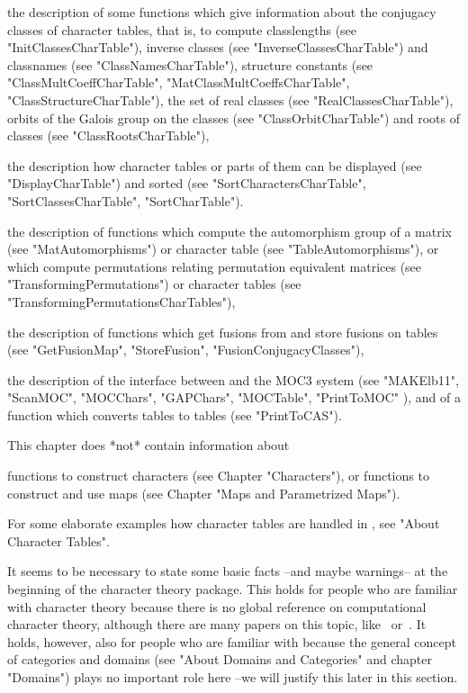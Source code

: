 the  description  of  some functions  which  give information  about  the
conjugacy  classes of character tables, that  is, to compute classlengths
(see       "InitClassesCharTable"),      inverse       classes       (see
"InverseClassesCharTable")  and  classnames  (see "ClassNamesCharTable"),
structure        constants        (see         "ClassMultCoeffCharTable",
"MatClassMultCoeffsCharTable",  "ClassStructureCharTable"),  the  set  of
real  classes (see "RealClassesCharTable"), orbits of the Galois group on
the  classes  (see  "ClassOrbitCharTable")  and  roots  of  classes  (see
"ClassRootsCharTable"),

the  description  how character tables or parts of them  can be displayed
(see  "DisplayCharTable")   and  sorted  (see  "SortCharactersCharTable",
"SortClassesCharTable", "SortCharTable").

the description of functions  which  compute  the automorphism group of a
matrix    (see    "MatAutomorphisms")    or    character    table    (see
"TableAutomorphisms"), or which compute permutations relating permutation
equivalent matrices (see "TransformingPermutations") or  character tables
(see "TransformingPermutationsCharTables"),

the description of functions which get fusions from and store fusions on
tables (see "GetFusionMap", "StoreFusion", "FusionConjugacyClasses"),

the description of the interface  between {\GAP} and the MOC3 system (see
"MAKElb11",  "ScanMOC", "MOCChars",  "GAPChars", "MOCTable", "PrintToMOC"
), and  of a function which converts {\GAP} tables  to {\CAS} tables (see
"PrintToCAS").

\vspace{5mm}
This chapter does *not* contain information about

functions   to  construct  characters  (see  Chapter  "Characters"),   or
functions to construct and use  maps  (see Chapter "Maps and Parametrized
Maps").

For some  elaborate examples how character tables are  handled in {\GAP},
see "About Character Tables".


It seems to be necessary to state some basic facts --and maybe warnings--
at the beginning of the character theory  package.  This holds for people
who  are  familiar  with  character theory  because there  is  no  global
reference on  computational  character  theory,  although  there are many
papers  on  this  topic,  like~\cite{NPP84}  or~\cite{LP91}.   It  holds,
however, also for people who are familiar with {\GAP} because the general
concept of categories and domains (see "About Domains and Categories" and
chapter  "Domains") plays no important  role here --we  will justify this
later in this section.

